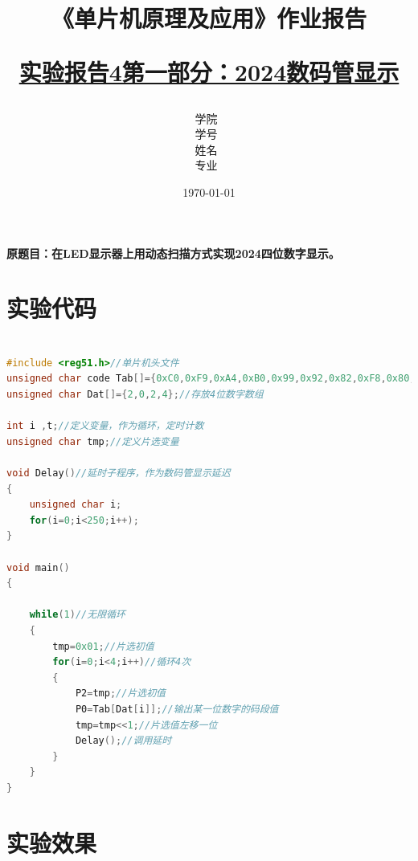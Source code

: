 \documentclass[12pt,hyperref,a4paper,UTF8]{ctexart}
\title{ 
        \vspace{1cm}
        \heiti \Huge \textbf{《单片机原理及应用》作业报告} \par
        \vspace{1cm} 
        \heiti \Large {\underline{实验报告4第一部分：2024数码管显示}   } 
        \vspace{3cm}
    
    }
\author{
        \vspace{0.5cm}
        \kaishu\Large 学院\ \dlmu[9cm]{卓越学院} \\ %
        \vspace{0.5cm}
        \kaishu\Large 学号\ \dlmu[9cm]{23040447} \\ %
        \vspace{0.5cm}
        \kaishu\Large 姓名\ \dlmu[9cm]{陈文轩} \qquad  \\ %
        \vspace{0.5cm}
        \kaishu\Large 专业\ \dlmu[9cm]{智能硬件与系统(电子信息工程)} \qquad \\ %
    }
\date{\today} %
\begin{document}
\cover
\thispagestyle{empty} %







\newpage
\setcounter{page}{1} %



\textbf{原题目：在LED显示器上用动态扫描方式实现2024四位数字显示。}


\section{实验代码}

\begin{lstlisting}[language=C, caption={实验程序}]

#include <reg51.h>//单片机头文件
unsigned char code Tab[]={0xC0,0xF9,0xA4,0xB0,0x99,0x92,0x82,0xF8,0x80,0x90};//共阳数码管码段表
unsigned char Dat[]={2,0,2,4};//存放4位数字数组
    
int i ,t;//定义变量，作为循环，定时计数
unsigned char tmp;//定义片选变量

void Delay()//延时子程序，作为数码管显示延迟
{
    unsigned char i;
    for(i=0;i<250;i++);
}
    
void main()
{

    while(1)//无限循环
    {
        tmp=0x01;//片选初值
        for(i=0;i<4;i++)//循环4次
        {
            P2=tmp;//片选初值
            P0=Tab[Dat[i]];//输出某一位数字的码段值
            tmp=tmp<<1;//片选值左移一位
            Delay();//调用延时
        }
    }
}

\end{lstlisting}

\section{实验效果}
\end{document}
